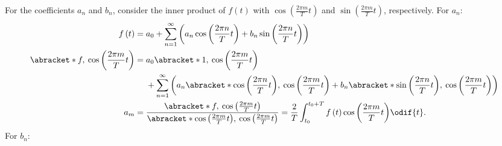 \documentclass{article}
\begin{document}
For the coefficients \(a_n\) and \(b_n\), consider the inner product of
\(f\left( t \right)\) with \(\cos{\left( \frac{2\pi m}{T} t \right)}\)
and \(\sin{\left( \frac{2\pi m}{T} t \right)}\), respectively. For \(a_n\):
\begin{align*}
    f\left( t \right)                                        & = a_0 + \sum_{n=1}^{\infty} \left( a_n \cos{\left( \frac{2\pi n}{T} t \right)} + b_n \sin{\left( \frac{2\pi n}{T} t \right)} \right)                                                                                                                                     \\
    \abracket*{f,\: \cos{\left( \frac{2\pi m}{T} t \right)}} & =
                                                                 \begin{aligned}[t]
                                                                      & a_0 \abracket*{1,\: \cos{\left( \frac{2\pi m}{T} t \right)}}                                                                                                                                                                                 \\
                                                                      & + \sum_{n=1}^{\infty} \left( a_n \abracket*{\cos{\left( \frac{2\pi n}{T} t \right)},\: \cos{\left( \frac{2\pi m}{T} t \right)}} + b_n \abracket*{\sin{\left( \frac{2\pi n}{T} t \right)},\: \cos{\left( \frac{2\pi m}{T} t \right)}} \right)
                                                                 \end{aligned}
    \\
    a_m                                                      & = \frac{\abracket*{f,\: \cos{\left( \frac{2\pi m}{T} t \right)}}}{\abracket*{\cos{\left( \frac{2\pi m}{T} t \right)},\: \cos{\left( \frac{2\pi m}{T} t \right)}}} = \frac{2}{T} \int_{t_0}^{t_0 + T} f\left( t \right) \cos{\left( \frac{2\pi m}{T} t \right)} \odif{t}.
\end{align*}
For \(b_n\):
\end{document}
